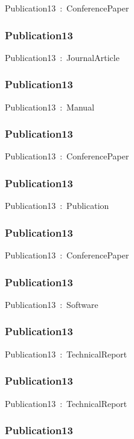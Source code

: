 \documentclass{article}
\begin{document}
Publication13~:~ConferencePaper

\subsubsection*{Publication13}

Publication13~:~JournalArticle

\subsubsection*{Publication13}

Publication13~:~Manual

\subsubsection*{Publication13}

Publication13~:~ConferencePaper

\subsubsection*{Publication13}

Publication13~:~Publication

\subsubsection*{Publication13}

Publication13~:~ConferencePaper

\subsubsection*{Publication13}

Publication13~:~Software

\subsubsection*{Publication13}

Publication13~:~TechnicalReport

\subsubsection*{Publication13}

Publication13~:~TechnicalReport

\subsubsection*{Publication13}
\end{document}

